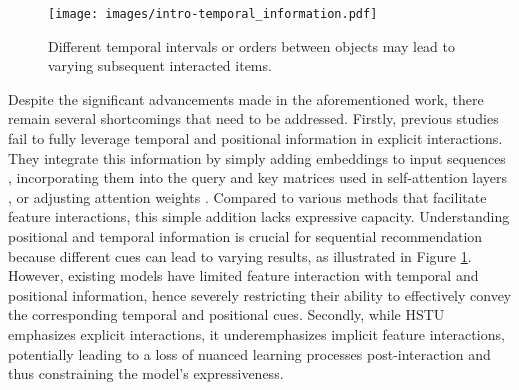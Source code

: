 \begin{figure}
    \centering
    \setlength{\abovecaptionskip}{0mm}
    \setlength{\belowcaptionskip}{-10px}
    \texttt{[image: images/intro-temporal\_information.pdf]}
    \caption{Different temporal intervals or orders between objects may lead to varying subsequent interacted items.}
    \label{fig:intro}
\end{figure}

Despite the significant advancements made in the aforementioned work, there remain several shortcomings that need to be addressed. 
Firstly, previous studies fail to fully leverage temporal and positional information in explicit interactions. They integrate this information by simply adding embeddings to input sequences \cite{kang2018self}, incorporating them into the query and key matrices used in self-attention layers \cite{tisasrec}, or adjusting attention weights \cite{zhai2024actions}. Compared to various methods that facilitate feature interactions, this simple addition lacks expressive capacity. Understanding positional and temporal information is crucial for sequential recommendation because different cues can lead to varying results, as illustrated in Figure \ref{fig:intro}. However, existing models have limited feature interaction with temporal and positional information, hence severely restricting their ability to effectively convey the corresponding temporal and positional cues. Secondly, while HSTU emphasizes explicit interactions, it underemphasizes implicit feature interactions, potentially leading to a loss of nuanced learning processes post-interaction and thus constraining the model's expressiveness.

